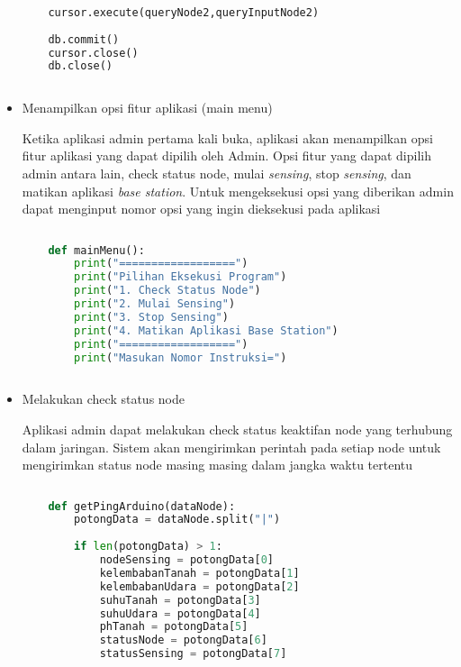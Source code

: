 \begin{itemize}
\begin{lstlisting}[label=sentDataSensing, language=Python, caption=Metode sentDataSensing(), numbers=none]
    
    cursor.execute(queryNode2,queryInputNode2)
    
    db.commit()
    cursor.close()
    db.close()
   
    \end{lstlisting}
       
   \item Menampilkan opsi fitur aplikasi (main menu)
   
   Ketika aplikasi admin pertama kali buka, aplikasi akan menampilkan opsi fitur aplikasi yang dapat dipilih oleh Admin. Opsi fitur yang dapat dipilih admin antara lain, check status node, mulai \textit{sensing}, stop \textit{sensing}, dan matikan aplikasi \textit{base station}. Untuk mengeksekusi opsi yang diberikan admin dapat menginput nomor opsi yang ingin dieksekusi pada aplikasi 
   
   \begin{lstlisting}[label=mainMenu, language=Python, caption=Metode mainMenu(), numbers=none]
        
    def mainMenu():
        print("==================")
        print("Pilihan Eksekusi Program")
        print("1. Check Status Node")
        print("2. Mulai Sensing")
        print("3. Stop Sensing")
        print("4. Matikan Aplikasi Base Station")
        print("==================")
        print("Masukan Nomor Instruksi=")
            
    \end{lstlisting}
    
    \item Melakukan check status node
    
    Aplikasi admin dapat melakukan check status keaktifan node yang terhubung dalam jaringan. Sistem akan mengirimkan perintah pada setiap node untuk mengirimkan status node masing masing dalam jangka waktu tertentu
    
    \begin{lstlisting}[label=getPingArduino, language=Python, caption=Metode getPingArduino(), numbers=none]
        
    def getPingArduino(dataNode):
        potongData = dataNode.split("|")
        
        if len(potongData) > 1:
            nodeSensing = potongData[0]
            kelembabanTanah = potongData[1]
            kelembabanUdara = potongData[2]
            suhuTanah = potongData[3]
            suhuUdara = potongData[4]
            phTanah = potongData[5]
            statusNode = potongData[6]
            statusSensing = potongData[7]
            

\end{lstlisting}
\end{itemize}
